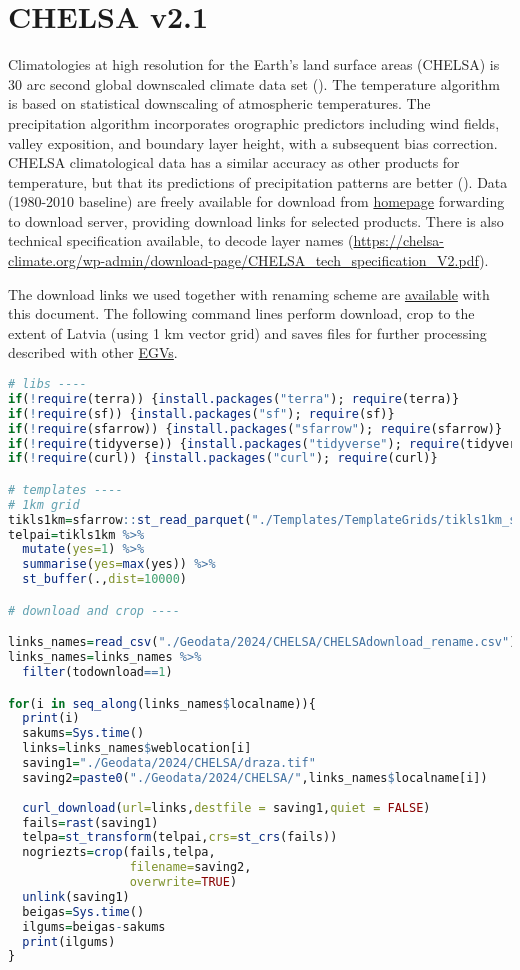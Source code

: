 \documentclass[
]{book}
\begin{document}
\section{CHELSA v2.1}\label{Ch04.11}

Climatologies at high resolution for the Earth's land surface areas (CHELSA) is
30 arc second global downscaled climate data set (). The temperature algorithm
is based on statistical downscaling of atmospheric temperatures. The precipitation
algorithm incorporates orographic predictors including wind fields, valley
exposition, and boundary layer height, with a subsequent bias correction. CHELSA
climatological data has a similar accuracy as other products for temperature, but
that its predictions of precipitation patterns are better (). Data
(1980-2010 baseline) are freely available for download
from \href{https://chelsa-climate.org/}{homepage} forwarding
to download server, providing download links for selected products. There is also technical
specification available, to decode layer names (\url{https://chelsa-climate.org/wp-admin/download-page/CHELSA_tech_specification_V2.pdf}).

The download links we used together with renaming scheme are \href{https://github.com/aavotins/HiQBioDiv_EGVs/blob/main/Data/Geodata/2024/CHELSA/CHELSAdownload_rename.csv}{available}
with this document. The following command lines perform download, crop to the
extent of Latvia (using 1 km vector grid) and saves files for further processing
described with other \hyperref[Ch06]{EGVs}.

\begin{lstlisting}[language=R]
# libs ----
if(!require(terra)) {install.packages("terra"); require(terra)}
if(!require(sf)) {install.packages("sf"); require(sf)}
if(!require(sfarrow)) {install.packages("sfarrow"); require(sfarrow)}
if(!require(tidyverse)) {install.packages("tidyverse"); require(tidyverse)}
if(!require(curl)) {install.packages("curl"); require(curl)}

# templates ----
# 1km grid
tikls1km=sfarrow::st_read_parquet("./Templates/TemplateGrids/tikls1km_sauzeme.parquet")
telpai=tikls1km %>% 
  mutate(yes=1) %>% 
  summarise(yes=max(yes)) %>% 
  st_buffer(.,dist=10000)

# download and crop ----

links_names=read_csv("./Geodata/2024/CHELSA/CHELSAdownload_rename.csv")
links_names=links_names %>% 
  filter(todownload==1)

for(i in seq_along(links_names$localname)){
  print(i)
  sakums=Sys.time()
  links=links_names$weblocation[i]
  saving1="./Geodata/2024/CHELSA/draza.tif"
  saving2=paste0("./Geodata/2024/CHELSA/",links_names$localname[i])
  
  curl_download(url=links,destfile = saving1,quiet = FALSE)
  fails=rast(saving1)
  telpa=st_transform(telpai,crs=st_crs(fails))
  nogriezts=crop(fails,telpa,
                 filename=saving2,
                 overwrite=TRUE)
  unlink(saving1)
  beigas=Sys.time()
  ilgums=beigas-sakums
  print(ilgums)
}
\end{lstlisting}
\end{document}
